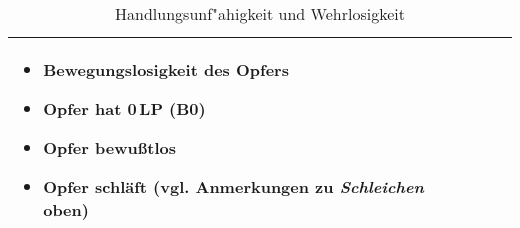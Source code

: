 \documentclass[10pt,a4paper,germanpar]{article}
\renewcommand{\arraystretch}{1.5}
\begin{document}
\begin{table}[htbp]
{\begin{center}
\begin{tabu}{|p{2.4cm}||p{4.3cm}|p{4.1cm}|p{4.5cm}|}
\begin{itemize}
      \item Bewegungslosigkeit des Opfers
      \item Opfer hat 0\,LP (B0)
      \item Opfer bewußtlos
      \item Opfer schläft (vgl. Anmerkungen zu \emph{Schleichen} oben)
      \end{itemize} \\
      \hline
    \end{tabu}
    \renewcommand{\arraystretch}{1.5}
    \caption{Handlungsunf"ahigkeit und Wehrlosigkeit}
    \label{tab:handlung}
  \end{center}
}
\end{table}

\end{document}
